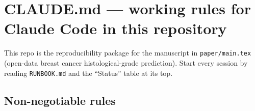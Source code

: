 \documentclass[
  10pt,
]{article}
\begin{document}
\hypertarget{claude.md-working-rules-for-claude-code-in-this-repository}{%
\section{CLAUDE.md --- working rules for Claude Code in this
repository}\label{claude.md-working-rules-for-claude-code-in-this-repository}}

This repo is the reproducibility package for the manuscript in
\texttt{paper/main.tex} (open-data breast cancer histological-grade
prediction). Start every session by reading \texttt{RUNBOOK.md} and the
``Status'' table at its top.

\hypertarget{non-negotiable-rules}{%
\subsection{Non-negotiable rules}\label{non-negotiable-rules}}
\end{document}
